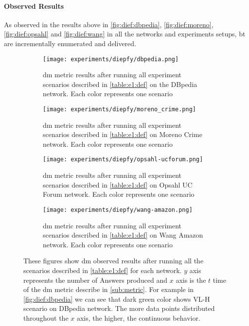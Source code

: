  \paragraph{Observed Results}\label{sub:sec:res:e1}
 As observed in the results above in \autoref{fig:dief:dbpedia}, \autoref{fig:dief:moreno}, \autoref{fig:dief:opsahl} and \autoref{fig:dief:wang} in all the networks and experiments setups, \acrshort{bt} are incrementally enumerated and delivered. 

 \begin{figure}[!htp]
  \centering
  \begin{subfigure}[t]{0.45\textwidth}
   \texttt{[image: experiments/diepfy/dbpedia.png]}
    \caption[{[EE] \acrshort{dm} Results: \acrshort{dbpedia}}]{\acrshort{dm} metric results after running all experiment scenarios described in \autoref{table:e1:def} on the DBpedia network. Each color represents one scenario}
    \label{fig:dief:dbpedia}
  \end{subfigure}\hfill
  \begin{subfigure}[t]{0.45\textwidth}
   \texttt{[image: experiments/diepfy/moreno\_crime.png]}
    \caption[{[EE] \acrshort{dm} Results: Moreno Crime}]{\acrshort{dm} metric results after running all experiment scenarios described in \autoref{table:e1:def} on Moreno Crime network. Each color represents one scenario}
    \label{fig:dief:moreno}
  \end{subfigure}
  \vspace{0.5cm}

  \begin{subfigure}[t]{0.45\textwidth}
   \texttt{[image: experiments/diepfy/opsahl-ucforum.png]}
    \caption[{[EE] \acrshort{dm} Results: Opsahl UC Forum}]{\acrshort{dm} metric results after running all experiment scenarios described in \autoref{table:e1:def} on Opsahl UC Forum network. Each color represents one scenario}
    \label{fig:dief:opsahl}
  \end{subfigure}\hfill
  \begin{subfigure}[t]{0.45\textwidth}
    \texttt{[image: experiments/diepfy/wang-amazon.png]}
     \caption[{[EE] \acrshort{dm} Results: Wang Amazon}]{\acrshort{dm} metric results after running all experiment scenarios described in \autoref{table:e1:def} on Wang Amazon network. Each color represents one scenario}
     \label{fig:dief:wang}
   \end{subfigure}
   \caption[{[EE] \acrshort{dm} General Results}]{These figures show \acrshort{dm} observed results after running all the scenarios described in \autoref{table:e1:def} for each network. $y$ axis represents the number of Answers produced and $x$ axis is the $t$ time of the \acrshort{dm} metric describe in \autoref{sub:metric}. For example in \autoref{fig:dief:dbpedia} we can see that dark green color shows VL-H scenario on DBpedia network. The more data points distributed throughout the $x$ axis, the higher, the continuous behavior.}
   \label{fig:dief:all}
 \end{figure}

